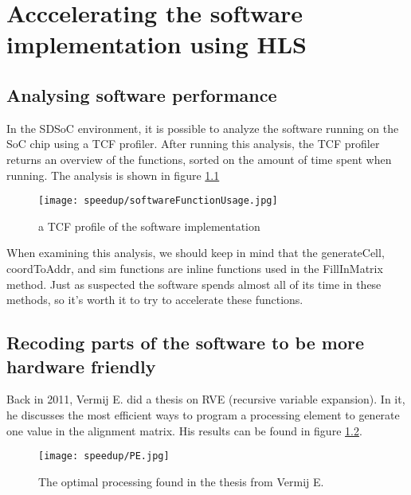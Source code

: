 
\chapter{Acccelerating the software implementation using HLS}

\section{Analysing software performance}

In the SDSoC environment, it is possible to analyze the software running on the SoC chip using a TCF profiler. After running this analysis, the TCF profiler returns an overview of the functions, sorted on the amount of time spent when running. The analysis is shown in figure \ref{fig:softwareFunctionUsage}

\begin{figure}[H]
	\centering
	\texttt{[image: speedup/softwareFunctionUsage.jpg]}
	\caption{a TCF profile of the software implementation}
	\label{fig:softwareFunctionUsage}
\end{figure}

When examining this analysis, we should keep in mind that the generateCell, coordToAddr, and sim functions are inline functions used in the FillInMatrix method. Just as suspected the software spends almost all of its time in these methods, so it's worth it to try to accelerate these functions.

\section{Recoding parts of the software to be more hardware friendly}

Back in 2011, Vermij E. did a thesis on RVE (recursive variable expansion). In it, he discusses the most efficient ways to program a processing element to generate one value in the alignment matrix. His results can be found in figure \ref{fig:PE}. 

\begin{figure}[H]
	\centering
	\texttt{[image: speedup/PE.jpg]}
	\caption{The optimal processing found in the thesis from Vermij E.}
	\label{fig:PE}
\end{figure}

